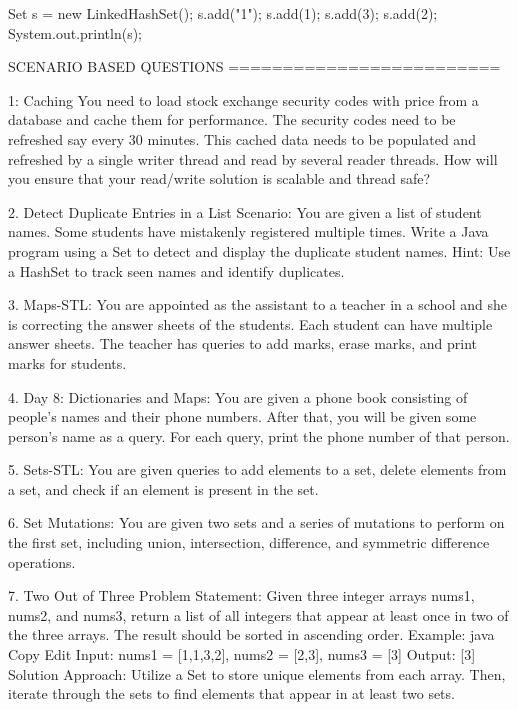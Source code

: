 {{{           Set s = new LinkedHashSet();
           s.add("1");
           s.add(1);
           s.add(3);
           s.add(2);
           System.out.println(s);
 
    }
}





SCENARIO BASED QUESTIONS
=========================

1: Caching
You need to load stock exchange security codes with price from a database and cache them for performance. The security codes need to be
refreshed say every 30 minutes. This cached data needs to be populated and refreshed by a single writer thread and read by several reader
threads. How will you ensure that your read/write solution is scalable and thread safe?


2.
Detect Duplicate Entries in a List
Scenario:
You are given a list of student names. Some students have mistakenly registered multiple times. Write a Java program using a Set to detect 
and display the duplicate student names.
Hint: Use a HashSet to track seen names and identify duplicates.

3.
Maps-STL: You are appointed as the assistant to a teacher in a school and she is correcting the answer sheets of the students. Each student can 
have multiple answer sheets. The teacher has queries to add marks, erase marks, and print marks for students. 


4.
Day 8: Dictionaries and Maps: You are given a phone book consisting of people's names and their phone numbers. After that, you will be given some 
person's name as a query. For each query, print the phone number of that person. 

5.
Sets-STL: You are given queries to add elements to a set, delete elements from a set, and check if an element is present in the set. 

6.
Set Mutations: You are given two sets and a series of mutations to perform on the first set, including union, intersection, difference,
 and symmetric difference operations. 

7.
Two Out of Three
Problem Statement:
Given three integer arrays nums1, nums2, and nums3, return a list of all integers that appear at least once in two of the three arrays.
The result should be sorted in ascending order.
Example:
java
Copy
Edit
Input: nums1 = [1,1,3,2], nums2 = [2,3], nums3 = [3]
Output: [3]
Solution Approach:
Utilize a Set to store unique elements from each array. Then, iterate through the sets to find elements that appear in at least two sets.


}
